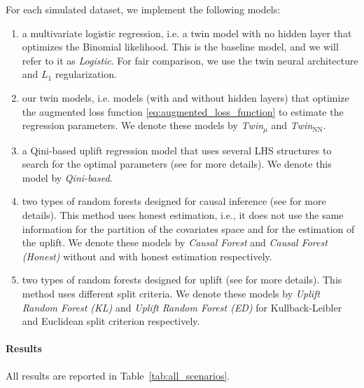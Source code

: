 For each simulated dataset, we implement the following models:
\begin{enumerate}
    \item[(a)] a multivariate logistic regression, i.e. a twin model with no hidden layer that optimizes the Binomial likelihood. This is the baseline model, and we will refer to it as \textit{Logistic}. For fair comparison, we use the twin neural architecture and $L_1$ regularization.
    \item[(b)] our twin models, i.e. models (with and without hidden layers) that optimize the augmented loss function \eqref{eq:augmented_loss_function} to estimate the regression parameters. We denote these models by \textit{Twin$_{\mu}$} and \textit{Twin$_{\mathrm{NN}}$}.
    \item[(c)] a Qini-based uplift regression model that uses several LHS structures to search for the optimal parameters (see \citep{belba2019qbased} for more details). We denote this model by \textit{Qini-based}.
    \item[(d)] two types of random forests designed for causal inference (see \citep{athey2019generalized} for more details). This method uses honest estimation, i.e., it does not use the same information for the partition of the covariates space and for the estimation of the uplift. We denote these models by \textit{Causal Forest} and \textit{Causal Forest (Honest)} without and with honest estimation respectively.
    \item[(e)] two types of random forests designed for uplift (see \citep{rzepakowski2010decision,guelman2012random} for more details). This method uses different split criteria. We denote these models by \textit{Uplift Random Forest (KL)} and \textit{Uplift Random Forest (ED)} for Kullback-Leibler and Euclidean split criterion respectively.
\end{enumerate}



\paragraph{Results} All results are reported in Table~\ref{tab:all_scenarios}.

